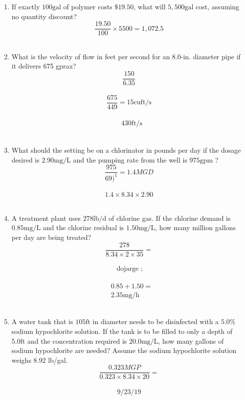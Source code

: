 \begin{enumerate}
\item If exactly $100 \mathrm{gal}$ of polymer costs $\$ 19.50$, what will $5,500 \mathrm{gal}$ cost, assuming no quantity discount?\\
$$\frac{19.50}{100} \times 5500=1,072.5$$\\

\item What is the velocity of flow in feet per second for an 8.0-in. diameter pipe if it delivers 675 gprax?\\
$$\frac{150}{6.35}$$\\

$$\frac{675}{449}=15 \mathrm{cuft} / \mathrm{s}$$\\

$$\begin{aligned} & 430 \mathrm{ft} / \mathrm{s} \end{aligned}$$\\

\item What should the setting be on a chlorinator in pounds per day if the dosage desired is $2.90 \mathrm{mg} / \mathrm{L}$ and the pumping rate from the well is $975 \mathrm{gpm}$ ?\\
$$\frac{975}{69)^{1}}=1.4 MGD $$\\
$$1.4 \times 8.34 \times 2.90$$\\

\item A treatment plant uses $278 \mathrm{lb} / \mathrm{d}$ of chlorine gas. If the chlorine demand is $0.85 \mathrm{mg} / \mathrm{L}$ and the chlorine residual is $1.50 \mathrm{mg} / \mathrm{L}$, how many million gallons per day are being treated?\\
$$\frac{278}{8.34 \times 2 \times 35}=$$\\
$$\text { dojarge } ;$$\\
$$\begin{aligned}& 0.85+1.50= \\& 2.35 \mathrm{mg} / \mathrm{h}\end{aligned}$$\\

\item A water tank that is $105 \mathrm{ft}$ in diameter needs to be disinfected with a $5.0 \%$ sodium hypochlorite solution. If the tank is to be filled to only a depth of $5.0 \mathrm{ft}$ and the concentration required is $20.0 \mathrm{mg} / \mathrm{L}$, how many gallons of sodium hypochlorite are needed? Assume the sodium hypochlorite solution weighs 8.92 lb/gal.\\
$$\frac{0.323 M G P}{0.323 \times 8.34 \times 20}=$$\\
$$9 / 23 / 19$$\\


\end{enumerate}
